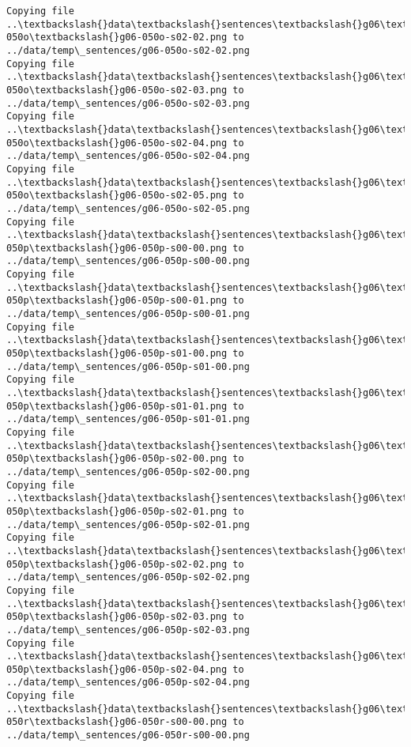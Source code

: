 \documentclass[11pt]{article}
\begin{document}
\begin{Verbatim}[commandchars=\\\{\}]
Copying file ..\textbackslash{}data\textbackslash{}sentences\textbackslash{}g06\textbackslash{}g06-050o\textbackslash{}g06-050o-s02-02.png to
../data/temp\_sentences/g06-050o-s02-02.png
Copying file ..\textbackslash{}data\textbackslash{}sentences\textbackslash{}g06\textbackslash{}g06-050o\textbackslash{}g06-050o-s02-03.png to
../data/temp\_sentences/g06-050o-s02-03.png
Copying file ..\textbackslash{}data\textbackslash{}sentences\textbackslash{}g06\textbackslash{}g06-050o\textbackslash{}g06-050o-s02-04.png to
../data/temp\_sentences/g06-050o-s02-04.png
Copying file ..\textbackslash{}data\textbackslash{}sentences\textbackslash{}g06\textbackslash{}g06-050o\textbackslash{}g06-050o-s02-05.png to
../data/temp\_sentences/g06-050o-s02-05.png
Copying file ..\textbackslash{}data\textbackslash{}sentences\textbackslash{}g06\textbackslash{}g06-050p\textbackslash{}g06-050p-s00-00.png to
../data/temp\_sentences/g06-050p-s00-00.png
Copying file ..\textbackslash{}data\textbackslash{}sentences\textbackslash{}g06\textbackslash{}g06-050p\textbackslash{}g06-050p-s00-01.png to
../data/temp\_sentences/g06-050p-s00-01.png
Copying file ..\textbackslash{}data\textbackslash{}sentences\textbackslash{}g06\textbackslash{}g06-050p\textbackslash{}g06-050p-s01-00.png to
../data/temp\_sentences/g06-050p-s01-00.png
Copying file ..\textbackslash{}data\textbackslash{}sentences\textbackslash{}g06\textbackslash{}g06-050p\textbackslash{}g06-050p-s01-01.png to
../data/temp\_sentences/g06-050p-s01-01.png
Copying file ..\textbackslash{}data\textbackslash{}sentences\textbackslash{}g06\textbackslash{}g06-050p\textbackslash{}g06-050p-s02-00.png to
../data/temp\_sentences/g06-050p-s02-00.png
Copying file ..\textbackslash{}data\textbackslash{}sentences\textbackslash{}g06\textbackslash{}g06-050p\textbackslash{}g06-050p-s02-01.png to
../data/temp\_sentences/g06-050p-s02-01.png
Copying file ..\textbackslash{}data\textbackslash{}sentences\textbackslash{}g06\textbackslash{}g06-050p\textbackslash{}g06-050p-s02-02.png to
../data/temp\_sentences/g06-050p-s02-02.png
Copying file ..\textbackslash{}data\textbackslash{}sentences\textbackslash{}g06\textbackslash{}g06-050p\textbackslash{}g06-050p-s02-03.png to
../data/temp\_sentences/g06-050p-s02-03.png
Copying file ..\textbackslash{}data\textbackslash{}sentences\textbackslash{}g06\textbackslash{}g06-050p\textbackslash{}g06-050p-s02-04.png to
../data/temp\_sentences/g06-050p-s02-04.png
Copying file ..\textbackslash{}data\textbackslash{}sentences\textbackslash{}g06\textbackslash{}g06-050r\textbackslash{}g06-050r-s00-00.png to
../data/temp\_sentences/g06-050r-s00-00.png

\end{Verbatim}
\end{document}
